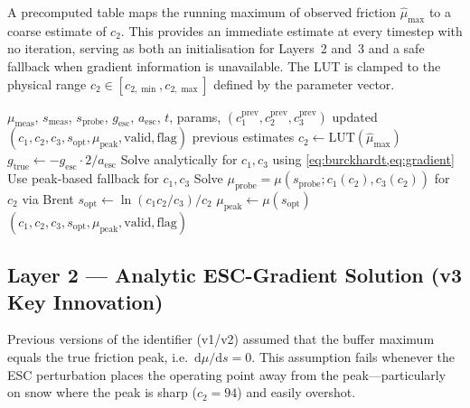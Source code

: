 \documentclass[11pt,a4paper]{article}
\newcommand{\mumax}{\mu_{\mathrm{peak}}}
\newcommand{\sopt}{s_{\mathrm{opt}}}
\begin{document}
A precomputed table maps the running maximum of observed friction
$\hat\mu_\mathrm{max}$ to a coarse estimate of $c_2$.
This provides an immediate estimate at every timestep with no iteration,
serving as both an initialisation for Layers~2 and~3 and a safe fallback
when gradient information is unavailable.
The LUT is clamped to the physical range $c_2 \in [c_{2,\min}, c_{2,\max}]$
defined by the parameter vector.

\begin{algorithm}[H]
\caption{ESC\_TwoPoint\_ID~v3 (one timestep)}
\label{alg:identifier}
\begin{algorithmic}[1]
\Require $\mu_\mathrm{meas}$, $s_\mathrm{meas}$, $s_\mathrm{probe}$,
         $g_\mathrm{esc}$, $a_\mathrm{esc}$, $t$, params,
         $(c_1^\mathrm{prev}, c_2^\mathrm{prev}, c_3^\mathrm{prev})$
\Ensure updated $(c_1, c_2, c_3, \sopt, \mumax, \mathrm{valid}, \mathrm{flag})$
  \State \Return previous estimates 
\EndIf
\State $c_2 \leftarrow \mathrm{LUT}(\hat\mu_\mathrm{max})$ 
  \State $g_\mathrm{true} \leftarrow -g_\mathrm{esc} \cdot 2 / a_\mathrm{esc}$
  \State Solve analytically for $c_1, c_3$ using \cref{eq:burckhardt,eq:gradient}
\Else
  \State Use peak-based fallback for $c_1, c_3$
\EndIf
{}
  \State Solve $\mu_\mathrm{probe} = \mu(s_\mathrm{probe}; c_1(c_2), c_3(c_2))$
         for $c_2$ via Brent 
\EndIf
\State $\sopt \leftarrow \ln(c_1 c_2 / c_3) / c_2$
\State $\mumax \leftarrow \mu(\sopt)$
\State \Return $(c_1, c_2, c_3, \sopt, \mumax, \mathrm{valid}, \mathrm{flag})$
\end{algorithmic}
\end{algorithm}

\subsection{Layer 2 — Analytic ESC-Gradient Solution (v3 Key Innovation)}

Previous versions of the identifier (v1/v2) assumed that the buffer maximum
equals the true friction peak, i.e.\ $\mathrm{d}\mu/\mathrm{d}s = 0$.
This assumption fails whenever the ESC perturbation places the operating point
away from the peak---particularly on snow where the peak is sharp ($c_2 = 94$)
and easily overshot.
\end{document}

